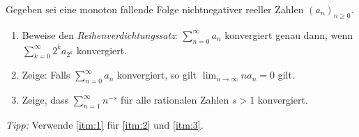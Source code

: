 \begin{prob}
  Gegeben sei eine monoton fallende Folge nichtnegativer reeller Zahlen
  $(a_n)_{n \geq 0}$.
  \begin{enumerate}[label=(\alph*)]
  \item \label{itm:1} Beweise den \textit{Reihenverdichtungssatz}:
    $\sum_{n=0}^\infty a_n$ konvergiert genau dann, wenn
    $\sum_{k=0}^\infty 2^ka_{2^k}$ konvergiert.
  \item \label{itm:2} Zeige: Falls $\sum_{n=0}^\infty a_n$ konvergiert, so gilt
    $\lim_{n\to\infty}na_n = 0$ gilt.
  \item \label{itm:3} Zeige, dass $\sum_{n=1}^{\infty} n^{-s}$ für alle
    rationalen Zahlen $s>1$ konvergiert.
  \end{enumerate}
  \textit{Tipp:} Verwende \ref{itm:1} für \ref{itm:2} und \ref{itm:3}.
\end{prob}
